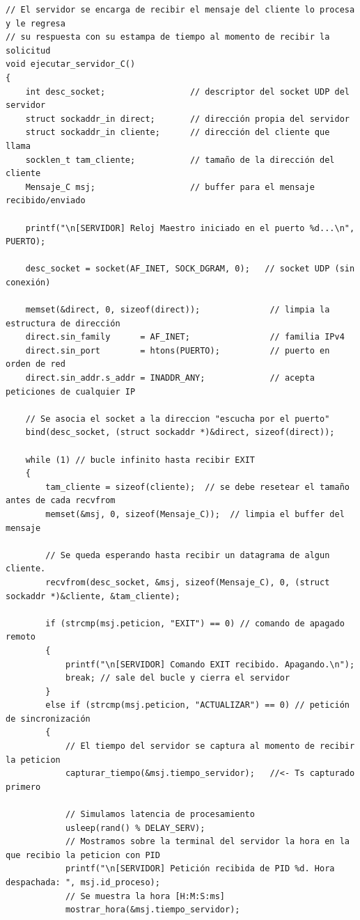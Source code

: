 \begin{lstlisting}[style=estiloC]
// El servidor se encarga de recibir el mensaje del cliente lo procesa y le regresa
// su respuesta con su estampa de tiempo al momento de recibir la solicitud
void ejecutar_servidor_C()
{
    int desc_socket;                 // descriptor del socket UDP del servidor
    struct sockaddr_in direct;       // dirección propia del servidor
    struct sockaddr_in cliente;      // dirección del cliente que llama
    socklen_t tam_cliente;           // tamaño de la dirección del cliente
    Mensaje_C msj;                   // buffer para el mensaje recibido/enviado

    printf("\n[SERVIDOR] Reloj Maestro iniciado en el puerto %d...\n", PUERTO);

    desc_socket = socket(AF_INET, SOCK_DGRAM, 0);   // socket UDP (sin conexión)

    memset(&direct, 0, sizeof(direct));              // limpia la estructura de dirección
    direct.sin_family      = AF_INET;                // familia IPv4
    direct.sin_port        = htons(PUERTO);          // puerto en orden de red
    direct.sin_addr.s_addr = INADDR_ANY;             // acepta peticiones de cualquier IP

    // Se asocia el socket a la direccion "escucha por el puerto"
    bind(desc_socket, (struct sockaddr *)&direct, sizeof(direct)); 

    while (1) // bucle infinito hasta recibir EXIT
    {
        tam_cliente = sizeof(cliente);  // se debe resetear el tamaño antes de cada recvfrom
        memset(&msj, 0, sizeof(Mensaje_C));  // limpia el buffer del mensaje

        // Se queda esperando hasta recibir un datagrama de algun cliente.
        recvfrom(desc_socket, &msj, sizeof(Mensaje_C), 0, (struct sockaddr *)&cliente, &tam_cliente);

        if (strcmp(msj.peticion, "EXIT") == 0) // comando de apagado remoto
        {
            printf("\n[SERVIDOR] Comando EXIT recibido. Apagando.\n");
            break; // sale del bucle y cierra el servidor
        }
        else if (strcmp(msj.peticion, "ACTUALIZAR") == 0) // petición de sincronización
        {
            // El tiempo del servidor se captura al momento de recibir la peticion
            capturar_tiempo(&msj.tiempo_servidor);   //<- Ts capturado primero

            // Simulamos latencia de procesamiento
            usleep(rand() % DELAY_SERV);
            // Mostramos sobre la terminal del servidor la hora en la que recibio la peticion con PID
            printf("\n[SERVIDOR] Petición recibida de PID %d. Hora despachada: ", msj.id_proceso);
            // Se muestra la hora [H:M:S:ms]
            mostrar_hora(&msj.tiempo_servidor);


\end{lstlisting}
